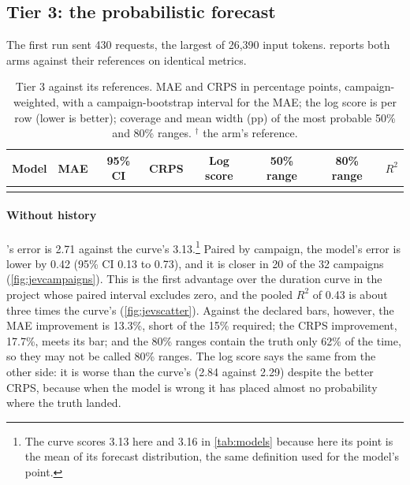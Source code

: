 \subsection{Tier 3: the probabilistic forecast}
\label{sec:results-tier3}

The first run sent 430 requests, the largest of 26,390 input tokens.  reports both arms against
their references on identical metrics.

\begin{table}[htbp]
\centering
\caption[Tier 3: forecast accuracy and calibration]{Tier 3 against its references. MAE and CRPS in percentage
points, campaign-weighted, with a campaign-bootstrap interval for the MAE; the log score is per row (lower is better);
coverage and mean width (pp) of the most probable 50\% and 80\% ranges. $^\dagger$ the arm's reference.}
\label{tab:forecast}
\small
\begin{tabularx}{\linewidth}{@{}Y c c c c c c c@{}}
\toprule
Model & MAE & 95\% CI & CRPS & Log score & 50\% range & 80\% range & $R^2$ \\
\midrule
{}
\bottomrule
\end{tabularx}
\end{table}

\paragraph{Without history} \Jev's error is 2.71\pp{} against the curve's 3.13\pp.\footnote{The curve scores
3.13\pp{} here and 3.16\pp{} in \cref{tab:models} because here its point is the mean of its forecast distribution, the
same definition used for the model's point.} Paired by campaign, the model's error is lower by 0.42\pp{} (95\% CI
0.13 to 0.73), and it is closer in 20 of the 32 campaigns (\cref{fig:jevcampaigns}). This is the first advantage over
the duration curve in the project whose paired interval excludes zero, and the pooled $R^2$ of 0.43 is about three
times the curve's (\cref{fig:jevscatter}). Against the declared bars, however, the MAE improvement is 13.3\%, short
of the 15\% required; the CRPS improvement, 17.7\%, meets its bar; and the 80\% ranges contain the truth only 62\% of
the time, so they may not be called 80\% ranges. The log score says the same from the other side: it is worse than
the curve's (2.84 against 2.29) despite the better CRPS, because when the model is wrong it has placed almost no
probability where the truth landed.

